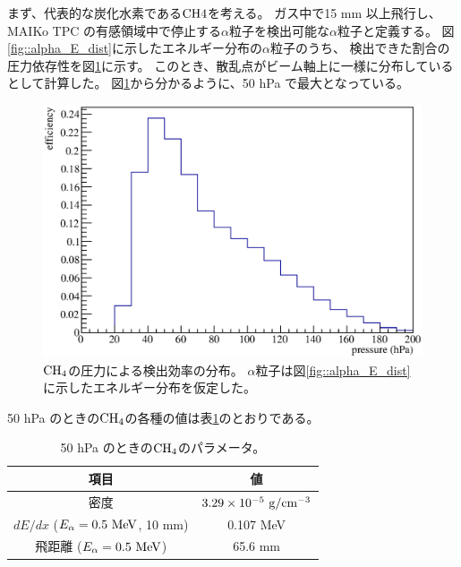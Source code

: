 \documentclass[../master]{subfiles}
\begin{document}
まず、代表的な炭化水素である${\rm CH{4}}$を考える。
ガス中で15 mm 以上飛行し、MAIKo TPC の有感領域中で停止する$\alpha$粒子を検出可能な$\alpha$粒子と定義する。
図\ref{fig::alpha_E_dist}に示したエネルギー分布の$\alpha$粒子のうち、
検出できた割合の圧力依存性を図\ref{fig::efficiency_P_dist}に示す。
このとき、散乱点がビーム軸上に一様に分布しているとして計算した。
図\ref{fig::efficiency_P_dist}から分かるように、50 hPa で最大となっている。
\begin{figure}
  \centering
  \includegraphics[clip, width=0.7\columnwidth]{efficiency_P_dist.eps}
  \caption[${\rm CH_{4}}$の圧力による検出効率の分布。]
          {${\rm CH_{4}}$の圧力による検出効率の分布。
            $\alpha$粒子は図\ref{fig::alpha_E_dist}に示したエネルギー分布を仮定した。
           }
  \label{fig::efficiency_P_dist}
\end{figure}
50 hPa のときの${\rm CH_{4}}$の各種の値は表\ref{tab::CH4_50_params}のとおりである。
\begin{table}
  \centering
  \caption{50 hPa のときの${\rm CH_{4}}$のパラメータ。}
  \label{tab::CH4_50_params}
  \begin{tabular}{cc}
    \toprule
    項目 & 値\\
    \midrule
    密度 & $3.29\times10^{-5}~{\rm g/cm^{-3}}$\\
    $dE/dx$ ($E_{\alpha} = 0.5~{\rm MeV}$, 10 mm) & 0.107 MeV\\
    飛距離 ($E_{\alpha} = 0.5~{\rm MeV}$) & 65.6 mm \\
    \bottomrule
  \end{tabular}
\end{table}
\end{document}
